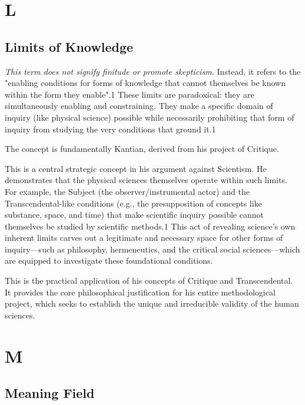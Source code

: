 \documentclass{book}
\begin{document}
\parencite{Carspecken2013aa}




\chapter{L}

\section{Limits of Knowledge}

\textit{This term does not signify finitude or promote skepticism.} Instead, it refers to the "enabling conditions for forms of knowledge that cannot themselves be known within the form they enable".1 These limits are paradoxical: they are simultaneously enabling and constraining. They make a specific domain of inquiry (like physical science) possible while necessarily prohibiting that form of inquiry from studying the very conditions that ground it.1

The concept is fundamentally Kantian, derived from his project of Critique.

This is a central strategic concept in his argument against Scientism. He demonstrates that the physical sciences themselves operate within such limits. For example, the Subject (the observer/instrumental actor) and the Transcendental-like conditions (e.g., the presupposition of concepts like substance, space, and time) that make scientific inquiry possible cannot themselves be studied by scientific methods.1 This act of revealing science's own inherent limits carves out a legitimate and necessary space for other forms of inquiry—such as philosophy, hermeneutics, and the critical social sciences—which are equipped to investigate these foundational conditions.

This is the practical application of his concepts of Critique and Transcendental. It provides the core philosophical justification for his entire methodological project, which seeks to establish the unique and irreducible validity of the human sciences.

\parencite{Carspecken2009aa}




\chapter{M}

\section{Meaning Field}
\end{document}
